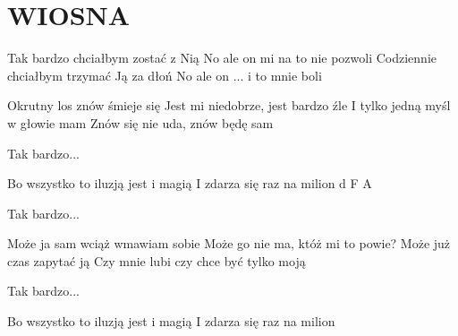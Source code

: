 \documentclass[../../../songbook.tex]{subfiles}
\begin{document}
\TabPositions{8cm} %
\section*{WIOSNA}
\vspace{0.5cm}

\-\hspace{1cm} Tak bardzo chciałbym zostać z Nią		 \newline
\-\hspace{1cm} No ale on mi na to nie pozwoli			 \newline
\-\hspace{1cm} Codziennie chciałbym trzymać Ją za dłoń	 \newline
\-\hspace{1cm} No ale on ... i to mnie boli				 \newline

Okrutny los znów śmieje się		 \newline
Jest mi niedobrze, jest bardzo źle	 \newline
I tylko jedną myśl w głowie mam		 \newline
Znów się nie uda, znów będę sam	 \newline

\-\hspace{1cm} Tak bardzo...		\newline	

Bo wszystko to iluzją jest i magią		 \newline
I zdarza się raz na milion 			d F A \newline

\-\hspace{1cm} Tak bardzo...		\newline	

Może ja sam wciąż wmawiam sobie			\newline
Może go nie ma, któż mi to powie?		\newline
Może już czas zapytać ją				\newline
Czy mnie lubi czy chce być tylko moją	\newline

\-\hspace{1cm} Tak bardzo...			\newline	

Bo wszystko to iluzją jest i magią		\newline
I zdarza się raz na milion				\newline
\end{document}

